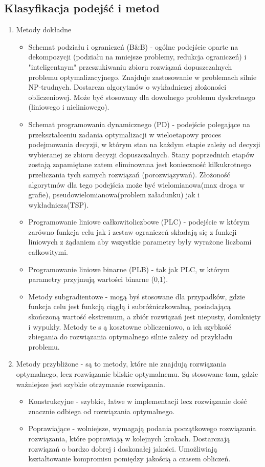 	\subsection{Klasyfikacja podejść i metod}
	\begin{enumerate}
		\item Metody dokładne
			\begin{itemize}
				\item Schemat podziału i ograniczeń (B\&B) - ogólne podejście oparte na dekompozycji
				(podziału na mniejsze problemy, redukcja ograniczeń) i
				"inteligentnym" przeszukiwaniu zbioru rozwiązań dopuszczalnych problemu optymalizacyjnego.
				Znajduje zastosowanie w problemach silnie NP-trudnych. Dostarcza algorytmów o wykładniczej
				złożoności obliczeniowej. Może być stosowany dla dowolnego problemu dyskretnego (liniowego i
				nieliniowego).
				\item Schemat programowania dynamicznego (PD) - podejście polegające na przekształceniu zadania
				optymalizacji w wieloetapowy proces podejmowania decyzji, w którym stan na każdym etapie
				zależy od decyzji wybieranej ze zbioru decyzji dopuszczalnych. Stany poprzednich etapów
				zostają zapamiętane zatem eliminowana jest konieczność kilkukrotnego przeliczania tych 
				samych rozwiązań (porozwiązywań). Złożoność algorytmów dla tego podejścia może być 
				wielomianowa(max droga w grafie), pseudowielomianowa(problem załadunku) 
				jak i wykładnicza(TSP).
				\item Programowanie liniowe całkowitoliczbowe (PLC) - podejście w którym zarówno funkcja celu 
				jak i zestaw ograniczeń składają się z funkcji liniowych z żądaniem aby wszystkie 
				parametry były wyrażone liczbami całkowitymi.
				\item Programowanie liniowe binarne (PLB) - tak jak PLC, w którym parametry przyjmują 
				wartości binarne (0,1).
				\item Metody subgradientowe - mogą byś stosowane dla przypadków, gdzie funkcja celu jest
				funkcją ciągłą i subróżniczkowalną, posiadającą skończoną wartość ekstremum, a zbiór 
				rozwiązań jest niepusty, domknięty i wypukły. Metody te s ą kosztowne obliczeniowo, a ich
				szybkość zbiegania do rozwiązania optymalnego silnie zależy od przykładu problemu.
			\end{itemize}
		\item Metody przybliżone - są to metody, które nie znajdują rozwiązania optymalnego, lecz
		rozwiązanie bliskie optymalnemu. Są stosowane tam, gdzie ważniejsze jest szybkie otrzymanie 
		rozwiązania.
			\begin{itemize}
				\item Konstrukcyjne - szybkie, łatwe w implementacji lecz rozwiązanie dość znacznie
				odbiega od rozwiązania optymalnego.
				\item Poprawiające - wolniejsze, wymagają podania początkowego rozwiązania rozwiązania,
				które poprawiają w kolejnych krokach. Dostarczają rozwiązań o bardzo dobrej i doskonałej
				jakości. Umożliwiają kształtowanie kompromisu pomiędzy jakością a czasem obliczeń.
			\end{itemize}
	\end{enumerate}